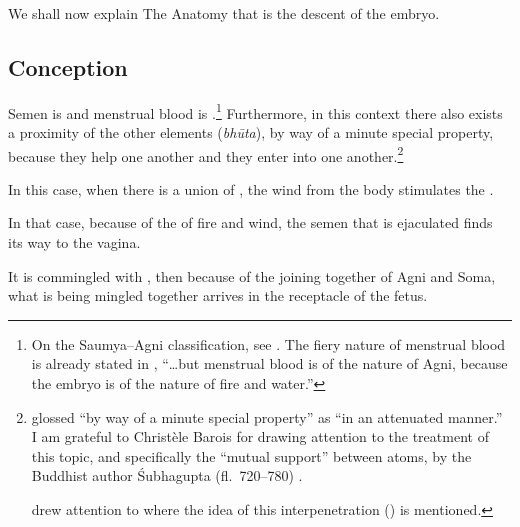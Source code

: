 \begin{translation}


\item[1] 

We shall now explain The Anatomy that is the descent of the embryo. 

\subsection{Conception}
\item[3]

Semen is  and menstrual blood is
.\footnote{On the Saumya--Agni
    classification, see \cites{wuja-2004}{ange-2021}[521--527]{das-2003}.
    The fiery nature of menstrual blood is already stated in
    , “\ldots but menstrual blood is of the nature of Agni,
    because the embryo is of the nature of fire and water.”} Furthermore,
in this context there also exists a proximity of the other elements
(\emph{bhūta}), by way of a minute special
property, because they
help one another and they enter into one
another.\footnote{ glossed 
    “by way of a minute special property” as  “in an
    attenuated manner.”\label{anuna-visesena} I am grateful to Christèle
    Barois for drawing attention to the treatment of this topic, and
    specifically the  “mutual support” between atoms,
    by the Buddhist author Śubhagupta (fl.~720--780) 
    \cite[126]{sacc-2015}.
        
         drew attention
        to  where the idea of this interpenetration
        () is mentioned.}


\item [4]

In this case, when there is a union of , the
wind from the body stimulates the .

In that case, because of the  of fire and
wind, the semen that is ejaculated finds its way to the vagina.

It is commingled with , then because
of the joining together of Agni and Soma, what is being mingled together
arrives in the receptacle of the fetus. 


\end{translation}
